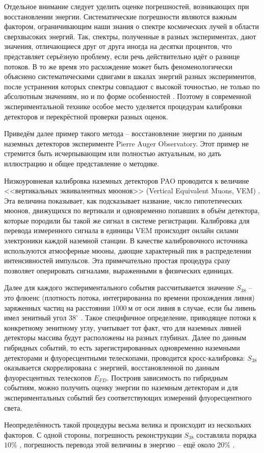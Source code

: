 Отдельное внимание следует уделить оценке погрешностей, возникающих при восстановлении энергии. Систематические погрешности являются важным фактором, ограничивающим наши знания о спектре космических лучей в области сверхвысоких энергий. Так, спектры, полученные в разных экспериментах, дают значения, отличающиеся друг от друга иногда на десятки процентов, что представляет серьёзную проблему, если речь действительно идёт о разнице потоков. В то же время это расхождение может быть феноменологически объяснено систематическими сдвигами в шкалах энергий разных экспериментов, после устранения которых спектры совпадают с высокой точностью, не только по абсолютным значениям, но и по форме особенностей \cite{wg2013}. Поэтому в современной экспериментальной технике особое место уделяется процедурам калибровки детекторов и перекрёстной проверки разных оценок.

Приведём далее пример такого метода -- восстановление энергии по данным наземных детекторов эксперименте Pierre Auger Observatory. Этот пример не стремится быть исчерпывающим или полностью актуальным, но дать иллюстрацию и общее представление о методике.

Низкоуровневая калибровка наземных детекторов PAO проводится к величине <<вертикальных эквивалентных мюонов>> (Vertical Equivalent Muons, VEM) \cite{Bertou2006}. Эта величина показывает, как подсказывает название, число гипотетических мюонов, движущихся по вертикали и одновременно попавших в объём детектора, которые породили бы такой же сигнал в системе регистрации. Калибровка для перевода измеренного сигнала в единицы VEM происходит онлайн силами электроники каждой наземной станции. В качестве калибровочного источника используются атмосферные мюоны, дающие характерный пик в распределении интенсивностей импульсов. Эта примечательно простая процедура сразу позволяет оперировать сигналами, выраженными в физических единицах.

Далее для каждого экспериментального события рассчитывается значение $S_{38}$ -- это флюенс (плотность потока, интегрированна по времени прохождения ливня) заряженных частиц на расстоянии $1000~\text{м}$ от оси ливня в случае, если бы ливень имел зенитный угол $38^{\circ}$ \cite{PAO-ICRC-2005}. Такое  специфичное определение, приводящее потоки к конкретному зенитному углу, учитывает тот факт, что для наземных ливней детекторы массива будут расположены на разных глубинах. Далее по данным гибридных событий, то есть зарегистрированных одновременно наземными детекторами и флуоресцентными телескопами, проводится кросс-калибровка: $S_{38}$ оказывается скоррелирована с энергией, восстановленной по данным флуоресцентных телескопов $E_{FD}$. Построив зависимость по гибридным событиям, можно получить оценку энергии по наземным детекторам и для экспериментальных событий без соответствующих измерений флуоресцентного света.

Неопределённость такой процедуры весьма велика и происходит из нескольких факторов. С одной стороны, погрешность реконструкции $S_{38}$ составляла порядка $10 \%$ \cite{Collaboration2005}, погрешность перевода этой величины в энергию -- ещё около $20 \%$ \cite{Roth2007}.
